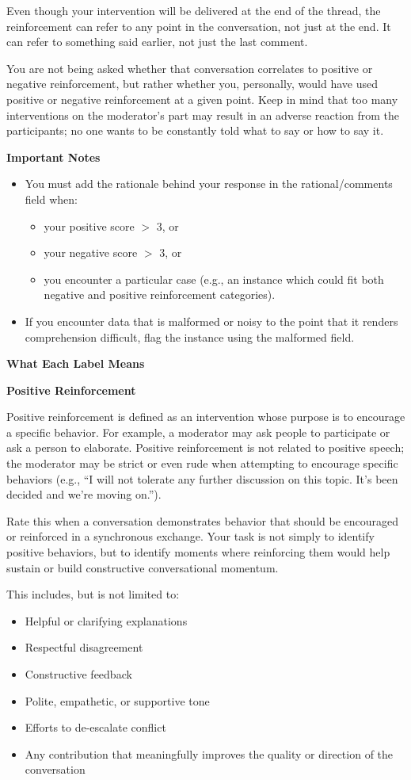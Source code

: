 \documentclass[11pt]{article}
\theoremstyle{definition}
\theoremstyle{plain}
\begin{document}
Even though your intervention will be delivered at the end of the thread, the reinforcement can refer to any point in the conversation, not just at the end. It can refer to something said earlier, not just the last comment.

You are not being asked whether that conversation correlates to positive or negative reinforcement, but rather whether you, personally, would have used positive or negative reinforcement at a given point. Keep in mind that too many interventions on the moderator’s part may result in an adverse reaction from the participants; no one wants to be constantly told what to say or how to say it.

\textbf{Important Notes}
\begin{itemize}
	\item You must add the rationale behind your response in the rational/comments field when:
	\begin{itemize}
		\item your positive score $>$ 3, or
		\item your negative score $>$ 3, or
		\item you encounter a particular case (e.g., an instance which could fit both negative and positive reinforcement categories).
	\end{itemize}
	\item If you encounter data that is malformed or noisy to the point that it renders comprehension difficult, flag the instance using the malformed field.
\end{itemize}

\textbf{What Each Label Means}

\textbf{Positive Reinforcement}

Positive reinforcement is defined as an intervention whose purpose is to encourage a specific behavior. For example, a moderator may ask people to participate or ask a person to elaborate. Positive reinforcement is not related to positive speech; the moderator may be strict or even rude when attempting to encourage specific behaviors (e.g., ``I will not tolerate any further discussion on this topic. It's been decided and we're moving on.'').

Rate this when a conversation demonstrates behavior that should be encouraged or reinforced in a synchronous exchange. Your task is not simply to identify positive behaviors, but to identify moments where reinforcing them would help sustain or build constructive conversational momentum.

This includes, but is not limited to:
\begin{itemize}
	\item Helpful or clarifying explanations
	\item Respectful disagreement
	\item Constructive feedback
	\item Polite, empathetic, or supportive tone
	\item Efforts to de-escalate conflict
	\item Any contribution that meaningfully improves the quality or direction of the conversation
\end{itemize}
\end{document}
